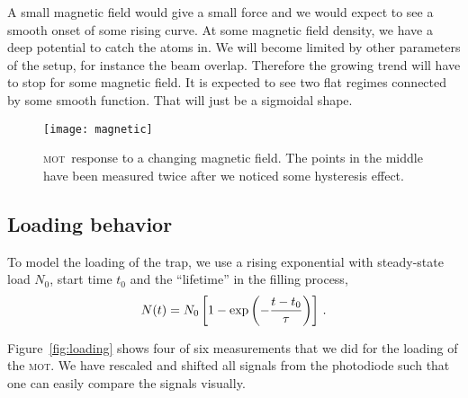 \documentclass[11pt, english, fleqn, DIV=15, headinclude, BCOR=2cm]{scrreprt}
\newcommand\mot{\textsc{mot}}
\begin{document}
A small magnetic field would give a small force and we would expect to see a
smooth onset of some rising curve. At some magnetic field density, we have a
deep potential to catch the atoms in. We will become limited by other
parameters of the setup, for instance the beam overlap. Therefore the growing
trend will have to stop for some magnetic field. It is expected to see two flat
regimes connected by some smooth function. That will just be a sigmoidal shape.

\begin{figure}
    \centering
    \texttt{[image: magnetic]}
    \caption{%
        \mot\ response to a changing magnetic field. The points in the middle
        have been measured twice after we noticed some hysteresis effect.
    }
    \label{fig:magnetic}
\end{figure}

\subsection{Loading behavior}

To model the loading of the trap, we use a rising exponential with steady-state
load $N_0$, start time $t_0$ and the \enquote{lifetime} in the filling process,
\[
    N(t) = N_0 \left[ 1 - \exp\left( - \frac{t - t_0}{\tau} \right) \right] \,.
\]

Figure~\ref{fig:loading} shows four of six measurements that we did for the
loading of the \mot. We have rescaled and shifted all signals from the
photodiode such that one can easily compare the signals visually.
\end{document}
